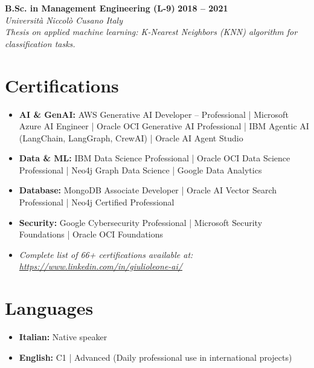 \documentclass[11pt, letterpaper]{article}
\begin{document}
\vspace{8pt}

\noindent \textbf{B.Sc. in Management Engineering (L-9)} \hfill \textbf{2018 -- 2021} \\
\textit{Universit\`a Niccol\`o Cusano} \hfill \textit{Italy} \\
\textit{Thesis on applied machine learning: K-Nearest Neighbors (KNN) algorithm for classification tasks.}

\section*{Certifications}
\begin{itemize}
    \item \textbf{AI \& GenAI:} AWS Generative AI Developer -- Professional | Microsoft Azure AI Engineer | Oracle OCI Generative AI Professional | IBM Agentic AI (LangChain, LangGraph, CrewAI) | Oracle AI Agent Studio
    \item \textbf{Data \& ML:} IBM Data Science Professional | Oracle OCI Data Science Professional | Neo4j Graph Data Science | Google Data Analytics
    \item \textbf{Database:} MongoDB Associate Developer | Oracle AI Vector Search Professional | Neo4j Certified Professional
    \item \textbf{Security:} Google Cybersecurity Professional | Microsoft Security Foundations | Oracle OCI Foundations
    \item \textit{Complete list of 66+ certifications available at: \url{https://www.linkedin.com/in/giulioleone-ai/}}
\end{itemize}

\section*{Languages}
\begin{itemize}
    \item \textbf{Italian:} Native speaker
    \item \textbf{English:} C1 | Advanced (Daily professional use in international projects)
\end{itemize}
\end{document}
